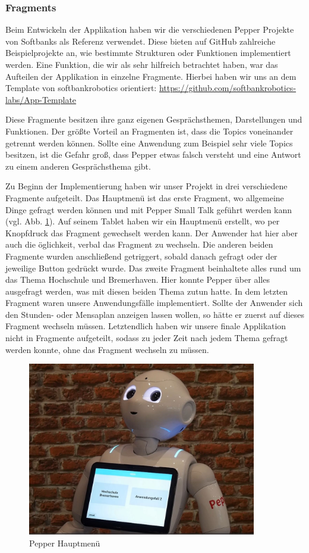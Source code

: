 \subsubsection{Fragments}

Beim Entwickeln der Applikation haben wir die verschiedenen Pepper Projekte von Softbanks als Referenz verwendet. Diese bieten auf GitHub zahlreiche Beispielprojekte an, wie bestimmte Strukturen oder Funktionen implementiert werden. Eine Funktion, die wir als sehr hilfreich betrachtet haben, war das Aufteilen der Applikation in einzelne Fragmente. Hierbei haben wir uns an dem Template von softbankrobotics orientiert: \url{https://github.com/softbankrobotics-labs/App-Template}

Diese Fragmente besitzen ihre ganz eigenen Gesprächsthemen, Darstellungen und Funktionen. Der größte Vorteil an Fragmenten ist, dass die Topics voneinander getrennt werden können. Sollte eine Anwendung zum Beispiel sehr viele Topics besitzen, ist die Gefahr groß, dass Pepper etwas falsch versteht und eine Antwort zu einem anderen Gesprächsthema gibt.

Zu Beginn der Implementierung haben wir unser Projekt in drei verschiedene Fragmente aufgeteilt. Das Hauptmenü ist das erste Fragment, wo allgemeine Dinge gefragt werden können und mit Pepper Small Talk geführt werden kann (vgl. Abb. \ref{fig:Mainmenu}). Auf seinem Tablet haben wir ein Hauptmenü erstellt, wo per Knopfdruck das Fragment gewechselt werden kann. Der Anwender hat hier aber auch die öglichkeit, verbal das Fragment zu wechseln. Die anderen beiden Fragmente wurden anschließend getriggert, sobald danach gefragt oder der jeweilige Button gedrückt wurde. Das zweite Fragment beinhaltete alles rund um das Thema Hochschule und Bremerhaven. Hier konnte Pepper über alles ausgefragt werden, was mit diesen beiden Thema zutun hatte. In dem letzten Fragment waren unsere Anwendungsfälle implementiert. Sollte der Anwender sich den Stunden- oder Mensaplan anzeigen lassen wollen, so hätte er zuerst auf dieses Fragment wechseln müssen. Letztendlich haben wir unsere finale Applikation nicht in Fragmente aufgeteilt, sodass zu jeder Zeit nach jedem Thema gefragt werden konnte, ohne das Fragment wechseln zu müssen.\\

\begin{figure}[H]
    \centering
    \includegraphics[width=10cm]{Figures/AppChapter/rx1.JPG}
    \caption{Pepper Hauptmenü}
    \label{fig:Mainmenu}
    \centering
\end{figure}

